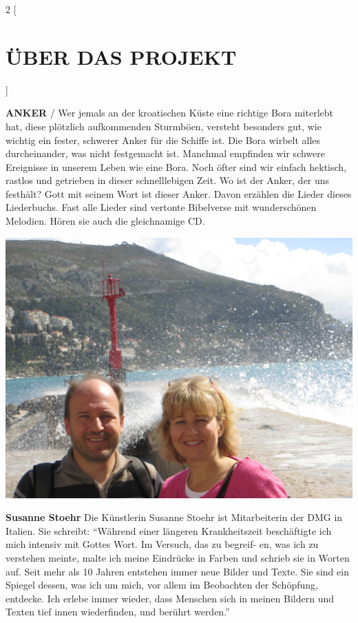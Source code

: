 \documentclass[a4paper,twoside, svgnames]{article}
\begin{document}
\newpage
\begin{multicols}{2}
[
\section*{ÜBER DAS PROJEKT}
]
    \begin{onehalfspacing}
        \begin{justify}
\textbf{ANKER} / Wer jemals an der kroatischen Küste eine richtige Bora miterlebt hat, diese plötzlich aufkommenden Sturmböen, versteht besonders gut, wie wichtig ein fester, schwerer Anker
für die Schiffe ist. Die Bora wirbelt alles durcheinander, was nicht festgemacht ist.
Manchmal empfinden wir schwere Ereignisse in unserem Leben wie eine Bora. Noch öfter
sind wir einfach hektisch, rastlos und getrieben in dieser schnelllebigen Zeit.
Wo ist der Anker, der uns festhält? Gott mit seinem Wort ist dieser Anker. Davon erzählen die Lieder dieses Liederbuchs. Fast alle Lieder
sind vertonte Bibelverse mit wunderschönen Melodien.
Hören sie auch die gleichnamige CD.

\begin{center}
\includegraphics[width=\linewidth]{images/IMG_1216}
\end{center}
\textbf{Susanne Stoehr} Die Künstlerin Susanne Stoehr ist Mitarbeiterin der DMG in Italien. Sie schreibt: “Während einer
längeren Krankheitszeit beschäftigte ich mich intensiv mit Gottes Wort. Im Versuch, das zu begreif-
en, was ich zu verstehen meinte, malte ich meine Eindrücke in Farben und schrieb sie in Worten
auf. Seit mehr als 10 Jahren entstehen immer neue Bilder und Texte. Sie sind ein Spiegel dessen,
was ich um mich, vor allem im Beobachten der Schöpfung, entdecke. Ich erlebe immer wieder, dass
Menschen sich in meinen Bildern und Texten tief innen wiederfinden, und berührt werden.”


\end{justify}
\end{onehalfspacing}
\end{multicols}
\end{document}
